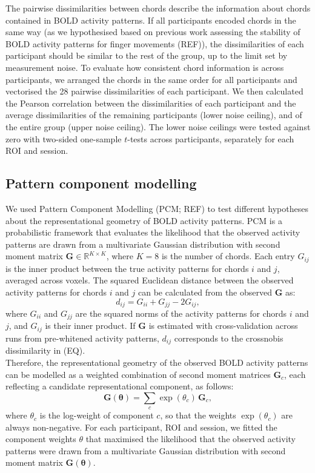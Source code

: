 \documentclass{article}
\begin{document}
The pairwise dissimilarities between chords describe the information about chords contained in BOLD activity patterns. If all participants encoded chords in the same way (as we hypothesised based on previous work assessing the stability of BOLD activity patterns for finger movements (REF)), the dissimilarities of each participant should be similar to the rest of the group, up to the limit set by measurement noise. To evaluate how consistent chord information is across participants, we arranged the chords in the same order for all participants and vectorised the 28 pairwise dissimilarities of each participant. We then calculated the Pearson correlation between the dissimilarities of each participant and the average dissimilarities of the remaining participants (lower noise ceiling), and of the entire group (upper noise ceiling). The lower noise ceilings were tested against zero with two-sided one-sample $t$-tests across participants, separately for each ROI and session. \\

\subsection{Pattern component modelling}

We used Pattern Component Modelling (PCM; REF) to test different hypotheses about the representational geometry of BOLD activity patterns. PCM is a probabilistic framework that evaluates the likelihood that the observed activity patterns are drawn from a multivariate Gaussian distribution with second moment matrix $\mathbf{G} \in \mathbb{R}^{K \times K}$, where $K = 8$ is the number of chords. Each entry $G_{ij}$ is the inner product between the true activity patterns for chords $i$ and $j$, averaged across voxels. The squared Euclidean distance between the observed activity patterns for chords $i$ and $j$ can be calculated from the observed $\mathbf{G}$ as:
\begin{equation}
    d_{ij} = G_{ii} + G_{jj} - 2G_{ij},
\end{equation}
where $G_{ii}$ and $G_{jj}$ are the squared norms of the activity patterns for chords $i$ and $j$, and $G_{ij}$ is their inner product. If $\mathbf{G}$ is estimated with cross-validation across runs from pre-whitened activity patterns, $d_{ij}$ corresponds to the crossnobis dissimilarity in (EQ).  \\

Therefore, the representational geometry of the observed BOLD activity patterns can be modelled as a weighted combination of second moment matrices $\mathbf{G}_c$, each reflecting a candidate representational component, as follows:
\begin{equation}
    \mathbf{G}(\boldsymbol{\theta}) = \sum_{c} \exp(\theta_c)\, \mathbf{G}_c,
\end{equation}
where $\theta_c$ is the log-weight of component $c$, so that the weights $\exp(\theta_c)$ are always non-negative. For each participant, ROI and session, we fitted the component weights $\theta$ that maximised the likelihood that the observed activity patterns were drawn from a multivariate Gaussian distribution with second moment matrix $\mathbf{G}(\boldsymbol{\theta})$. \\
\end{document}
